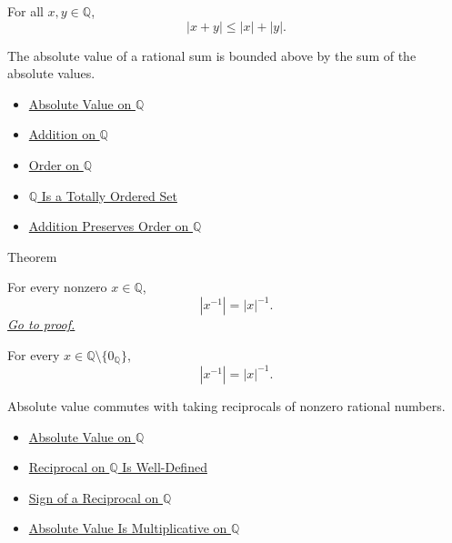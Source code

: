 \begin{remark*}
For all $x,y\in\mathbb{Q}$,
\[
|x+y|\le |x|+|y|.
\]
\end{remark*}

\begin{remark*}[Interpretation]
The absolute value of a rational sum is bounded above by the sum of the
absolute values.
\end{remark*}

\begin{dependencies}
\begin{itemize}
  \item \hyperref[def:absolute-value-on-q]{Absolute Value on $\mathbb{Q}$}
  \item \hyperref[def:addition-on-q-classes]{Addition on $\mathbb{Q}$}
  \item \hyperref[def:order-on-q]{Order on $\mathbb{Q}$}
  \item \hyperref[thm:q-totally-ordered-set]{$\mathbb{Q}$ Is a Totally Ordered Set}
  \item \hyperref[thm:addition-preserves-order-on-q]{Addition Preserves Order on $\mathbb{Q}$}
\end{itemize}
\end{dependencies}

\begin{theorembox}{Theorem}
\begin{theorem}
\label{thm:absolute-value-of-reciprocal-q}
For every nonzero $x\in\mathbb{Q}$,
\[
|x^{-1}|=|x|^{-1}.
\]
\hyperref[prf:absolute-value-of-reciprocal-q]{\textit{Go to proof.}}
\end{theorem}
\end{theorembox}

\begin{remark*}
For every $x\in\mathbb{Q}\setminus\{0_{\mathbb{Q}}\}$,
\[
|x^{-1}|=|x|^{-1}.
\]
\end{remark*}

\begin{remark*}[Interpretation]
Absolute value commutes with taking reciprocals of nonzero rational numbers.
\end{remark*}

\begin{dependencies}
\begin{itemize}
  \item \hyperref[def:absolute-value-on-q]{Absolute Value on $\mathbb{Q}$}
  \item \hyperref[thm:reciprocal-on-q-well-defined]{Reciprocal on $\mathbb{Q}$ Is Well-Defined}
  \item \hyperref[thm:sign-of-reciprocal-q]{Sign of a Reciprocal on $\mathbb{Q}$}
  \item \hyperref[thm:absolute-value-multiplicative-on-q]{Absolute Value Is Multiplicative on $\mathbb{Q}$}
\end{itemize}
\end{dependencies}
